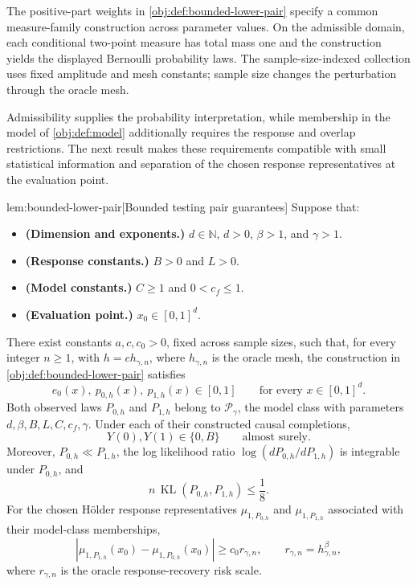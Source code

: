 The positive-part weights in \cref{obj:def:bounded-lower-pair} specify a common measure-family construction across parameter values. On the admissible domain, each conditional two-point measure has total mass one and the construction yields the displayed Bernoulli probability laws. The sample-size-indexed collection  uses fixed amplitude and mesh constants; sample size changes the perturbation through the oracle mesh.

Admissibility supplies the probability interpretation, while membership in the model of \cref{obj:def:model} additionally requires the response and overlap restrictions. The next result makes these requirements compatible with small statistical information and separation of the chosen response representatives at the evaluation point.

\begin{lemmav}{lem:bounded-lower-pair}[Bounded testing pair guarantees]
Suppose that:
\begin{itemize}
\item \textbf{(Dimension and exponents.)} \(d\in\mathbb N\), \(d>0\), \(\beta>1\), and \(\gamma>1\).
\item \textbf{(Response constants.)} \(B>0\) and \(L>0\).
\item \textbf{(Model constants.)} \(C\ge1\) and \(0<c_f\le1\).
\item \textbf{(Evaluation point.)} \(x_0\in[0,1]^d\).
\end{itemize}
There exist constants \(a,c,c_0>0\), fixed across sample sizes, such that, for every integer \(n\ge1\), with \(h=ch_{\gamma,n}\), where \(h_{\gamma,n}\) is the oracle mesh, the construction in \cref{obj:def:bounded-lower-pair} satisfies
\[
e_0(x),\ p_{0,h}(x),\ p_{1,h}(x)\in[0,1]
\qquad\text{for every }x\in[0,1]^d.
\]
Both observed laws \(P_{0,h}\) and \(P_{1,h}\) belong to \(\mathcal P_\gamma\), the model class with parameters \(d,\beta,B,L,C,c_f,\gamma\). Under each of their constructed causal completions,
\[
Y(0),Y(1)\in\{0,B\}
\qquad\text{almost surely}.
\]
Moreover, \(P_{0,h}\ll P_{1,h}\), the log likelihood ratio
\(\log(dP_{0,h}/dP_{1,h})\) is integrable under \(P_{0,h}\), and
\[
n\,\operatorname{KL}(P_{0,h},P_{1,h})\le\frac18.
\]
For the chosen Hölder response representatives \(\mu_{1,P_{0,h}}\) and \(\mu_{1,P_{1,h}}\) associated with their model-class memberships,
\[
\left|\mu_{1,P_{1,h}}(x_0)-\mu_{1,P_{0,h}}(x_0)\right|
\ge c_0 r_{\gamma,n},
\qquad
r_{\gamma,n}=h_{\gamma,n}^{\beta},
\]
where \(r_{\gamma,n}\) is the oracle response-recovery risk scale.
\end{lemmav}

